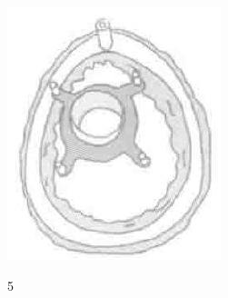 \documentclass[10pt]{article}
\begin{document}
\begin{center}
\includegraphics[max width=\textwidth]{2024_07_05_645bb794a4d4f32ee0c8g-283(4)}
\end{center}

5
\end{document}
